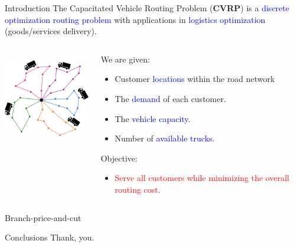 \begin{frame}
	\maketitle
\end{frame}

\begin{frame}{Introduction}
	The Capacitated Vehicle Routing Problem (\textbf{CVRP}) is a \textcolor{blue}{discrete optimization routing problem} with applications in \textcolor{blue}{logistics optimization} (goods/services delivery).

	\vspace{0.5cm}

	\begin{columns}
		\begin{column}{.35\textwidth}
			\centering
			\includegraphics[height=4cm]{Imgs/CVRP-example-without-truck.out.cropped.pdf}
		\end{column}
		\begin{column}{.65\textwidth}
			We are given:
			\begin{itemize}
				\item Customer \textcolor{blue}{locations} within the road network
				\item The \textcolor{blue}{demand} of each customer.
				\item The \textcolor{blue}{vehicle capacity}.
				\item Number of \textcolor{blue}{available trucks}.
			\end{itemize}
			Objective:
			\begin{itemize}
				\item \textcolor{red}{Serve all customers while minimizing the overall routing cost}.
			\end{itemize}
		\end{column}
	\end{columns}

\end{frame}

\begin{frame}{Branch-price-and-cut}
\end{frame}

\begin{frame}{Conclusions}
	Thank, you.

	\cite{jepsen2014}
\end{frame}

\begin{frame}
	\maketitle
\end{frame}

